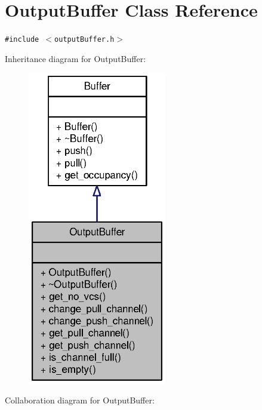 \section{OutputBuffer Class Reference}
\label{classOutputBuffer}
{\tt \#include $<$outputBuffer.h$>$}

Inheritance diagram for OutputBuffer:\nopagebreak
\begin{figure}[H]
\begin{center}
\leavevmode
\includegraphics[width=172pt]{classOutputBuffer__inherit__graph}
\end{center}
\end{figure}
Collaboration diagram for OutputBuffer:\nopagebreak
